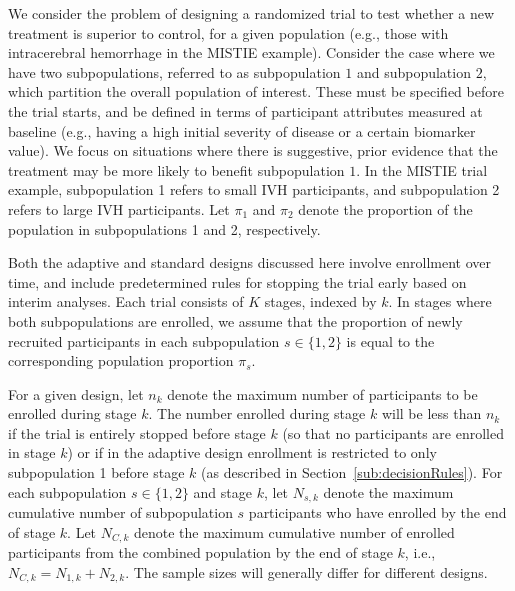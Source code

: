 \documentclass[article]{jss}
\begin{document}
We consider the problem of designing a randomized trial to test whether a new treatment is superior to control, for a given population (e.g., those with intracerebral hemorrhage in  the MISTIE example).
Consider the case where we have two subpopulations, referred to as subpopulation $1$ and subpopulation $2$, which partition the overall population of interest. These must be specified before the trial starts, and be defined in terms of participant attributes measured at baseline (e.g., having a high initial severity of disease or a certain biomarker value). 
We focus on situations where  there is suggestive, prior evidence that the treatment may be more likely to benefit subpopulation $1$.
In the MISTIE trial example, subpopulation 1 refers to small IVH participants, and subpopulation 2 refers to large IVH participants. 
Let $π_1$ and $π_2$ denote the proportion of the population in subpopulations 1 and 2, respectively. %

Both the adaptive and standard designs discussed here involve enrollment over time, and include predetermined rules for stopping the trial early based on interim analyses. Each trial consists of $K$ stages, indexed by $k$. 
In stages where both subpopulations are enrolled, we assume that the proportion of newly recruited participants  in each subpopulation $s \in \{1,2\}$ is equal to the corresponding population proportion $\pi_s$. %

For a given design, let $n_k$ denote the maximum number of participants to be enrolled during stage $k$. The number enrolled during stage $k$ will be less than $n_k$ if the trial is entirely stopped before stage $k$ (so that no participants are enrolled in stage $k$) or if in the adaptive design enrollment is restricted to only subpopulation 1 before stage $k$ (as described in Section~\ref{sub:decisionRules}). For each subpopulation $s \in \{1,2\}$ and stage $k$, let $N_{s,k}$ denote the maximum cumulative number of subpopulation $s$ participants who have enrolled by the end of stage $k$. Let $N_{C,k}$ denote the maximum cumulative number of enrolled participants from the combined population by the end of stage $k$, i.e.,  $N_{C,k}=N_{1,k}+N_{2,k}$.
The sample sizes will generally differ for different designs.
\end{document}
